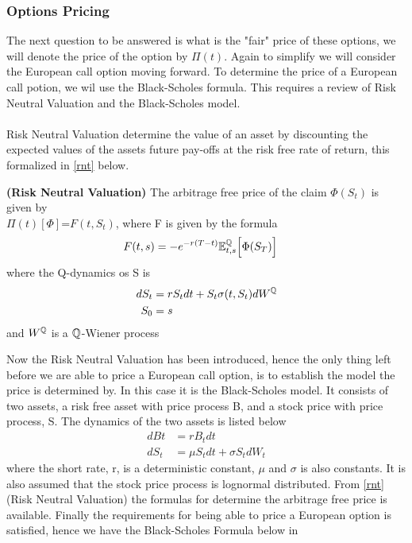 \subsubsection{Options Pricing}
The next question to be answered is what is the "fair" price of these options, we will denote the price of
the option by $\Pi(t)$. Again to simplify we will consider
the European call option moving forward. To determine the price of a European call potion, we wil use the 
Black-Scholes formula. This requires a review of Risk Neutral Valuation and the Black-Scholes model.
\\\\
Risk Neutral Valuation determine the value of an asset by discounting the expected values of the assets future 
pay-offs at the risk free rate of return, this formalized in \autoref{rnt} below.
\begin{theorem}
    \textbf{(Risk Neutral Valuation)} The arbitrage free price of the claim $\Phi(S_t)$ is given by \\
    $\Pi(t)[\Phi]$=$F(t,S_t)$, where F is given by the formula 
    \begin{align*}
        F(t,s) &= -e^{-r(T-t)} \mathbb{E}_{t,s}^{\mathbb{Q}} \Big[\Phi(S_T)\Big]
    \end{align*}
    where the Q-dynamics os S is
    \begin{align*}
        dS_t & = r S_t dt + S_t \sigma(t,S_t) dW^{\mathbb{Q}} \\
        S_0 & = s
    \end{align*}
    and $W^{\mathbb{Q}}$ is a $\mathbb{Q}$-Wiener process \cite{Bjork}
    \label{rnt}
\end{theorem}
\noindent 
Now the Risk Neutral Valuation has been introduced, hence the only thing left before we are able to price a 
European call option, is to establish the model the price is determined by. In this case it is the Black-Scholes model.
It consists of two assets, a risk free asset with price process B, and a stock price with price process, S.
The dynamics of the two assets is listed below
\begin{align*}
    dBt & = rB_t dt \\
    dS_t &= \mu S_t dt + \sigma S_t dW_t
\end{align*}
where the short rate, r, is  a deterministic constant,  $\mu$ and $\sigma$ is also constants. It is also assumed
that the stock price process is lognormal distributed. From \autoref{rnt}
(Risk Neutral Valuation) the formulas for determine the arbitrage free price is available. Finally the requirements
for being able to price a European option is satisfied, hence we have the Black-Scholes Formula below in
